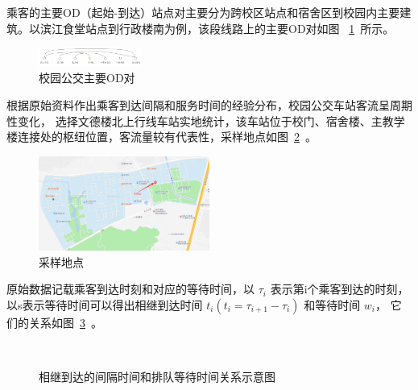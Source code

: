 乘客的主要OD（起始-到达）站点对主要分为跨校区站点和宿舍区到校园内主要建筑。以滨江食堂站点到行政楼南为例，该段线路上的主要OD对如图
~\ref{fig3}~所示。
\begin{figure}[htbp]
    \centering
    \includegraphics[width=0.3\textwidth]{figs/chap03/OD.png}
    \caption{校园公交主要OD对}
    \label{fig3}
    \end{figure}
根据原始资料作出乘客到达间隔和服务时间的经验分布，校园公交车站客流呈周期性变化，
选择文德楼北上行线车站实地统计，该车站位于校门、宿舍楼、主教学楼连接处的枢纽位置，客流量较有代表性，采样地点如图~\ref{fig31}~。
\begin{figure}[htbp!]
    \centering
    \includegraphics[width=0.5\textwidth]{figs/chap03/map.png}
    \caption{采样地点}
    \label{fig31}
\end{figure}

原始数据记载乘客到达时刻和对应的等待时间，以 $\tau_i$ 表示第i个乘客到达的时刻，以s表示等待时间可以得出相继到达时间 $t_i \left(t_i = \tau_{i+1} - \tau_i\right)$ 和等待时间 $w_i$，
它们的关系如图~\ref{fig32}~。
    
\begin{figure}[htbp!]
    \center
    \\
    \caption{相继到达的间隔时间和排队等待时间关系示意图}\label{fig32}
\end{figure}
    
